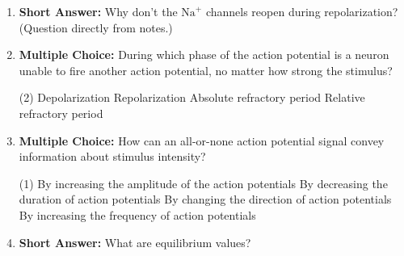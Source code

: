 \begin{enumerate}[label=\textbf{Q2.3.\arabic*}]

      \item \textbf{Short Answer:} Why don't the \(\text{Na}^{+}\) channels reopen during repolarization? (Question directly from notes.) \\

      \item \textbf{Multiple Choice:} During which phase of the action potential is a neuron unable to fire another action potential, no matter how strong the stimulus?
            \begin{tasks}[label=\textcolor{draculafg}{(\Alph*)}, item-format=\color{draculafg}, label-width=1.5em, item-indent=1.7em](2)
                  \task Depolarization
                  \task Repolarization
                  \task Absolute refractory period
                  \task Relative refractory period
            \end{tasks}

      \item \textbf{Multiple Choice:} How can an all-or-none action potential signal convey information about stimulus intensity?
            \begin{tasks}[label=\textcolor{draculafg}{(\Alph*)}, item-format=\color{draculafg}, label-width=1.5em, item-indent=1.7em](1)
                  \task By increasing the amplitude of the action potentials
                  \task By decreasing the duration of action potentials
                  \task By changing the direction of action potentials
                  \task By increasing the frequency of action potentials
            \end{tasks}

      \item \textbf{Short Answer:} What are equilibrium values? \\


\end{enumerate}
